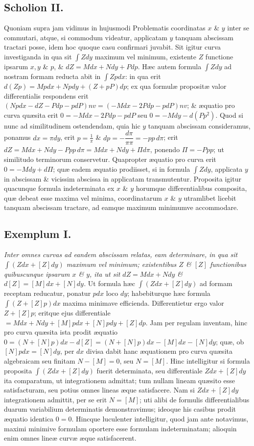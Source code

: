 \subsection*{Scholion II.}
Quoniam supra jam vidimus in hujusmodi Problematis coordinatas $x$ \& $y$ inter se commutari, atque, si commodum videatur, applicatam $y$ tanquam abscissam tractari posse, idem hoc quoque casu confirmari juvabit. Sit igitur curva investiganda in qua sit $\int Zdy$ maximum vel minimum, existente $Z$ functione ipsarum $x,y$ \& $p$, \& $dZ=Mdx+Ndy+Pdp$. Hæc autem formula $\int Zdy$ ad nostram formam reducta abit in $\int Zpdx$: in qua erit $d(Zp)=Mpdx+Npdy+(Z+pP)dp$; ex qua formulæ propositæ valor differentialis respondens erit $(Npdx-dZ-Pdp-pdP)nv=(-Mdx-2Pdp-pdP)nv$; \& æquatio pro curva quæsita erit $0=-Mdx-2Pdp-pdP$ seu $0=-Mdy-d(Pp^2)$. Quod si nunc ad similitudinem ostendendam, quia hic $y$ tanquam abscissam consideramus, ponamus $dx=\pi dy$, erit $p=\frac1\pi$ \& $dp=-\dfrac{d\pi}{\pi\pi}=-pp\,d\pi$; erit $dZ=Mdx+Ndy-Ppp\,d\pi=Mdx+Ndy+\Pi d\pi$, ponendo $\Pi=-Ppp$; ut similitudo terminorum conservetur. Quapropter æquatio pro curva erit $0=-Mdy+d\Pi$; quæ eadem æquatio prodiisset, si in formula $\int Zdy$, applicata $y$ in abscissam \& vicissim abscissa in applicatam transmutentur. Proposita igitur quacunque formula indeterminata ex $x$ \& $y$ horumque differentialibus composita, quæ debeat esse maxima vel minima, coordinatarum $x$ \& $y$ utramlibet licebit tanquam abscissam tractare, ad eamque maximum minimumve accommodare.

\subsection*{Exemplum I.}
\textit{Inter omnes curvas ad eandem abscissam relatas, eam determinare, in qua sit $\int(Zdx+[Z]dy)$ maximum vel minimum; existentibus $Z$ \& $[Z]$ functionibus quibuscunque ipsarum $x$ \& $y$, ita ut sit $dZ=Mdx+Ndy$ \& $d[Z]=[M]dx+[N]dy$.}
Ut formula hæc $\int(Zdx+[Z]dy)$ ad formam receptam reducatur, ponatur $pdx$ loco $dy$; habebiturque hæc formula $\int(Z+[Z]p)dx$ maxima minimave efficienda. Differentietur ergo valor $Z+[Z]p$; eritque ejus differentiale $=Mdx+Ndy+[M]pdx+[N]pdy+[Z]dp$. Jam per regulam inventam, hinc pro curva quæsita ista prodit æquatio $0=(N+[N]p)dx-d[Z]=(N+[N]p)dx-[M]dx-[N]dy$; quæ, ob $[N]pdx=[N]dy$, per $dx$ divisa dabit hanc æquationem pro curva quæsita algebraicam seu finitam $N-[M]=0$, seu $N=[M]$. Hinc intelligitur si formula proposita $\int(Zdx+[Z]dy)$ fuerit determinata, seu differentiale $Zdx+[Z]dy$ ita comparatum, ut integrationem admittat; tum nullam lineam quæsito esse satisfacturam, seu potius omnes lineas æque satisfacere. Nam si $Zdx+[Z]dy$ integrationem admittit, per se erit $N=[M]$; uti alibi de formulis differentialibus duarum variabilium determinatis demonstravimus; ideoque his casibus prodit æquatio identica $0=0$. Hincque luculenter intelligitur, quod jam ante notavimus, maximi minimive formulam oportere esse formulam indeterminatam; alioquin enim omnes lineæ curvæ æque satisfacerent.

